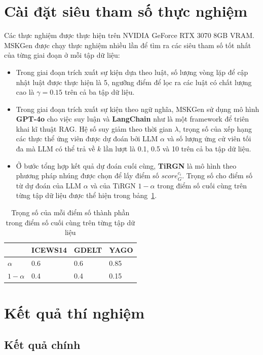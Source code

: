 \section{Cài đặt siêu tham số thực nghiệm}
Các thực nghiệm được thực hiện trên NVIDIA GeForce RTX 3070 8GB VRAM. MSKGen được chạy thực nghiệm nhiều lần để tìm ra các siêu tham số
tốt nhất của từng giai đoạn ở mỗi tập dữ liệu:
\begin{itemize}
    \item Trong giai đoạn trích xuất sự kiện dựa theo luật, số lượng vòng lặp để cập nhật luật được thực hiện là 5, 
ngưỡng điểm để lọc ra các luật có chất lượng cao là $\gamma = 0.15$ trên cả ba tập dữ liệu.
    \item Trong giai đoạn trích xuất sự kiện theo ngữ nghĩa, MSKGen sử dụng mô hình \textbf{GPT-4o} cho việc suy luận và
    \textbf{LangChain} như là một framework để triên khai kĩ thuật RAG.  
    Hệ số suy giảm theo thời gian $\lambda$, trọng số của xếp hạng các thực thể ứng viên được dự đoán bởi LLM $\alpha$ và
    số lượng ứng cử viên tối đa mà LLM có thể trả về $k$ lần lượt là 0.1, 0.5 và 10 trên cả ba tập dữ liệu. 
    \item Ở bước tổng hợp kết quả dự đoán cuối cùng, \textbf{TiRGN} là mô hình theo phương pháp nhúng được chọn để lấy điểm số $score_{G}^{c_i}$. 
    Trọng số cho điểm số từ dự đoán của LLM $\alpha$ và của TiRGN $1 - \alpha$
    trong điểm số cuối cùng trên từng tập dữ liệu được thể hiện trong bảng~\ref{tab:table53}.
\end{itemize}

\begin{table}[H]
\caption{Trọng số của mỗi điểm số thành phần trong điểm số cuối cùng trên từng tập dữ liệu}
\label{tab:table53}
\begin{adjustbox}{width=\textwidth}
\begin{tabular}{|l|l|l|l|}
\hline
           & ICEWS14 & GDELT & YAGO \\ \hline
$\alpha$   & 0.6     & 0.6   & 0.85 \\ \hline
$1-\alpha$ & 0.4     & 0.4   & 0.15 \\ \hline
\end{tabular}
\end{adjustbox}  
\end{table}
  

\section{Kết quả thí nghiệm}
\subsection{Kết quả chính}

